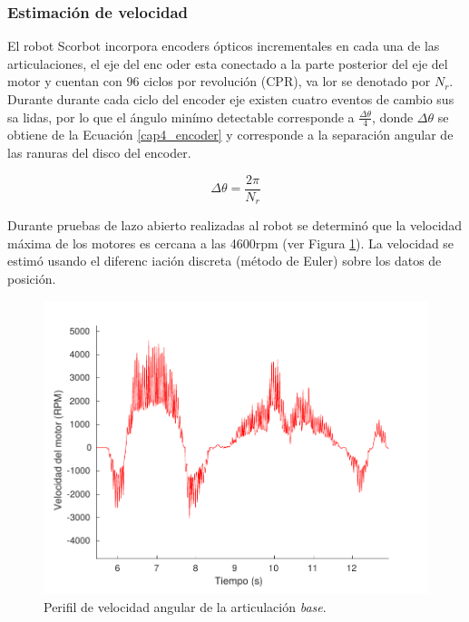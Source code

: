 \subsubsection{Estimación de velocidad}

El robot Scorbot incorpora encoders ópticos incrementales en cada una de las articulaciones, el eje del enc
oder esta conectado a la parte posterior del eje del motor y cuentan con $96$ ciclos por revolución (CPR), va
lor se denotado por $N_r$. Durante durante cada ciclo del encoder eje existen cuatro eventos de cambio sus sa
lidas, por lo que el ángulo minímo detectable corresponde a $\frac{\Delta\theta}{4}$, donde $\Delta\theta$ se obtiene de la Ecuación \ref{cap4_encoder} y corresponde a la separación angular de las ranuras del disco del encoder.

\begin{equation}\label{cap4_encoder}
	\Delta\theta = \frac{2\pi}{N_r}
\end{equation}

Durante pruebas de lazo abierto realizadas al robot se determinó que la velocidad máxima de los motores es 
cercana a las \si{4600}{rpm} (ver Figura \ref{cap4_max_velocidad}). La velocidad se estimó usando el diferenc
iación discreta (método de Euler) sobre los datos de posición.

\begin{figure}[ht]
	\centering
	\includegraphics[scale=0.6]{img/cap4/max_velocidad}
	\caption{Perifil de velocidad angular de la articulación \textit{base}.}
	\label{cap4_max_velocidad}
\end{figure}

